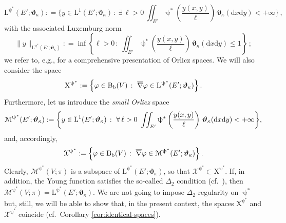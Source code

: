 \documentclass[11pt,reqno]{amsart}
\numberwithin{equation}{section}
\newcommand{\R}{\mathbb{R}}
\newcommand{\dd}{\mathrm{d}}
\theoremstyle{definition}
\newtheorem{assumption}[theorem]{Assumption}
\def\dd{\mathrm{d}}
\newcommand{\Bb}{\mathrm{B}_{\mathrm b}}
\newcommand{\teta}{\boldsymbol \vartheta}
\newcommand{\tetapi}{\boldsymbol{\teta}_{\kappa}}
\newcommand{\Ed}{{E'}}
\newcommand{\rmL}{\mathrm{L}}
\newcommand{\rmX}{\mathrm{X}}
\newcommand{\RCR}{\color{magenta}}
\newcommand{\WARNING}{\color{red}}
\numberwithin{equation}{section}
\begin{document}
\[
 \rmL^{\uppsi^*}(\Ed;\tetapi): = \biggl\{ y \in \rmL^1(\Ed;\tetapi)\, : \ \exists\, \ell> 0 \ \iint_{\Ed} \uppsi^*\left(\frac{y(x,y)}{\ell}\right) \, \tetapi(\dd x \dd y) <+\infty\biggr\}\,,
 \]
with the associated Luxemburg norm
\[
\|y \|_{\rmL^{\uppsi^*}(\Ed;\tetapi)} : = \inf\left\{ \ell > 0 \, : \   \iint_{\Ed} \uppsi^*\left(\frac{y(x,y)}{\ell}\right) \, \tetapi(\dd x \dd y)  \leq 1\right \}\,;
\]
 we refer to, e.g.,  \cite{RaoRen} for a comprehensive  presentation of Orlicz spaces. We will also consider the space
 \begin{equation}
 \label{X-L-Orli}
 \rmX^{\uppsi^*}: = \Bigl\{ \varphi \in \Bb(V)\,: \ \overline{\nabla}\varphi \in \rmL^{\uppsi^*}(\Ed;\tetapi)\Bigr\}\,.
 \end{equation}
 Furthermore, let us  introduce the 
 \RCR \emph{small Orlicz} space
\[
 \mathcal{M}^{\uppsi^*}(\Ed;\tetapi): = \biggl\{ y \in \rmL^1(\Ed;\tetapi)\, : \ \forall\, \ell> 0 \ \iint_{\Ed} \uppsi^*\left(\frac{y(x,y)}{\ell}\right) \, \tetapi(\dd x \dd y) <+\infty\biggr\}\\,
 \]
and, accordingly,  
  \begin{equation}
 \label{X-M-Orli}
 \mathcal{X}^{\uppsi^*}: = \Bigl\{ \varphi \in \Bb(V)\,: \ \overline{\nabla}\varphi \in \mathcal{M}^{\uppsi^*}(\Ed;\tetapi)\Bigr\}\,.
 \end{equation}
Clearly, $\mathcal{M}^{\uppsi^*}(V;\pi)$ is a  subspace of $\rmL^{\uppsi^*}(\Ed;\tetapi)$, so that $ \mathcal{X}^{\uppsi^*}\subset \rmX^{\uppsi^*}$. 
 If, in addition,
the Young function satisfies the so-called $\Delta_2$ condition (cf.\ \cite[\S 2.3, Definition 1]{RaoRen}), 
then $\mathcal{M}^{\uppsi^*}(V;\pi) =\rmL^{\uppsi^*}(\Ed;\tetapi)$.
We are not going to impose $\Delta_2$-regularity on $\uppsi^*$ but, still, we will be able to show that, in the present context, the spaces
 $ \rmX^{\uppsi^*}$ and $ \mathcal{X}^{\uppsi^*}$ coincide (cf.\ Corollary \ref{cor:identical-spaces}). 
\end{document}
